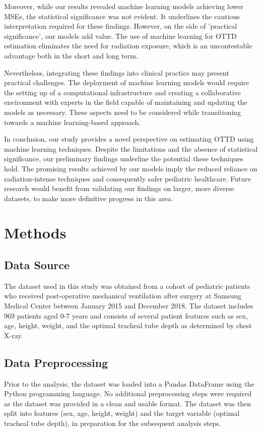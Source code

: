 \documentclass[11pt]{article}
\begin{document}
Moreover, while our results revealed machine learning models achieving lower MSEs, the statistical significance was not evident. It underlines the cautious interpretation required for these findings. However, on the side of 'practical significance', our models add value. The use of machine learning for OTTD estimation eliminates the need for radiation exposure, which is an uncontestable advantage both in the short and long term.

Nevertheless, integrating these findings into clinical practice may present practical challenges. The deployment of machine learning models would require the setting up of a computational infrastructure and creating a collaborative environment with experts in the field capable of maintaining and updating the models as necessary. These aspects need to be considered while transitioning towards a machine learning-based approach.

In conclusion, our study provides a novel perspective on estimating OTTD using machine learning techniques. Despite the limitations and the absence of statistical significance, our preliminary findings underline the potential these techniques hold. The promising results achieved by our models imply the reduced reliance on radiation-intense techniques and consequently safer pediatric healthcare. Future research would benefit from validating our findings on larger, more diverse datasets, to make more definitive progress in this area.

\section*{Methods}

\subsection*{Data Source}
The dataset used in this study was obtained from a cohort of pediatric patients who received post-operative mechanical ventilation after surgery at Samsung Medical Center between January 2015 and December 2018. The dataset includes 969 patients aged 0-7 years and consists of several patient features such as sex, age, height, weight, and the optimal tracheal tube depth as determined by chest X-ray.

\subsection*{Data Preprocessing}
Prior to the analysis, the dataset was loaded into a Pandas DataFrame using the Python programming language. No additional preprocessing steps were required as the dataset was provided in a clean and usable format. The dataset was then split into features (sex, age, height, weight) and the target variable (optimal tracheal tube depth), in preparation for the subsequent analysis steps.
\end{document}
